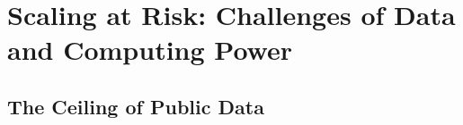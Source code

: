 
\section{Scaling at Risk: Challenges of Data and Computing Power}


\subsection{The Ceiling of Public Data}
\label{subsec:data_exhaustion}


